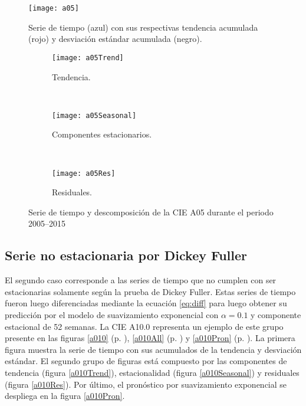 \documentclass[final,5p,times,twocolumn]{elsarticle}
\begin{document}
\begin{figure*}
    \texttt{[image: a05]}
  \caption{Serie de tiempo (azul) con sus respectivas tendencia acumulada (rojo) y desviación estándar acumulada (negro).}
  \label{a05} 
\end{figure*}
\begin{figure*}
  \centering
  \begin{subfigure}{\textwidth}
    \texttt{[image: a05Trend]}
  \caption{Tendencia.}
  \label{a05Trend}  
  \end{subfigure}  
  \\
  \begin{subfigure}{\textwidth}
    \texttt{[image: a05Seasonal]}
  \caption{Componentes estacionarios.}
  \label{a05Seasonal}  
  \end{subfigure}  
  \\
  \begin{subfigure}{\textwidth}
    \texttt{[image: a05Res]}
  \caption{Residuales.}
  \label{a05Res}  
  \end{subfigure}
  \caption{Serie de tiempo y descomposición de la CIE A05 durante el periodo 2005--2015}
  \label{a05All}
\end{figure*}

\subsection{Serie no estacionaria por Dickey Fuller}

El segundo caso corresponde a las series de tiempo que no cumplen con ser estacionarias solamente según la prueba de Dickey Fuller. Estas series de tiempo fueron luego diferenciadas mediante la ecuación \ref{eq:diff} para luego obtener su predicción por el modelo de suavizamiento exponencial con $\alpha = 0.1$ y componente estacional de 52 semanas. La CIE A10.0 representa un ejemplo de este grupo presente en las figuras \ref{a010} (p. \pageref{a010}), \ref{a010All} (p. \pageref{a010All}) y \ref{a010Pron} (p. \pageref{a010Pron}). La primera figura muestra la serie de tiempo con sus acumulados de la tendencia y desviación estándar. El segundo grupo de figuras está compuesto  por las componentes de tendencia (figura \ref{a010Trend}), estacionalidad (figura \ref{a010Seasonal}) y residuales (figura \ref{a010Res}). Por último, el pronóstico por suavizamiento exponencial se despliega en la figura \ref{a010Pron}.
\end{document}

